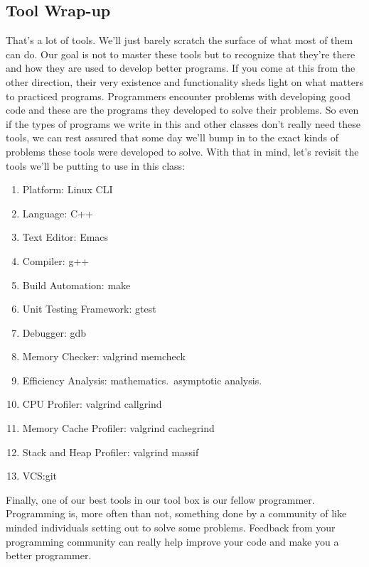 \documentclass[nobib]{tufte-handout}
\begin{document}
\subsection{Tool Wrap-up}

That's a lot of tools.  We'll just barely scratch the surface of what most of them can do.  Our goal is not to master these tools but to recognize that they're there and how they are used to develop better programs. If you come at this from the other direction, their very existence and functionality sheds light on what matters to practiced programs.  Programmers encounter problems with developing good code and these are the programs they developed to solve their problems.  So even if the types of programs we write in this and other classes don't really need these tools, we can rest assured that some day we'll bump in to the exact kinds of problems these tools were developed to solve. With that in mind, let's revisit the tools we'll be putting to use in this class:
\begin{enumerate}
\item Platform: Linux CLI
\item Language: C++
\item Text Editor: Emacs
\item Compiler: g++
\item Build Automation: make
\item Unit Testing Framework: gtest
\item Debugger: gdb
\item Memory Checker: valgrind memcheck
\item Efficiency Analysis: mathematics.\ asymptotic analysis.
\item CPU Profiler: valgrind callgrind
\item Memory Cache Profiler: valgrind cachegrind
\item Stack and Heap Profiler: valgrind massif
\item VCS:\@ git
\end{enumerate}
Finally, one of our best tools in our tool box is our fellow programmer. Programming is, more often than not, something done by a community of like minded individuals setting out to solve some problems. Feedback from your programming community can really help improve your code and make you a better programmer.
\end{document}
